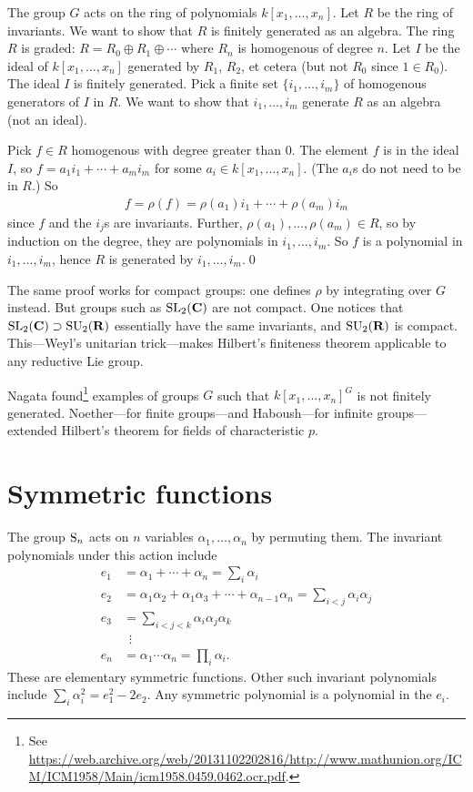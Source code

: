 \documentclass[11pt, oneside,margin=1in]{article}
\begin{document}
The group $G$ acts on the ring of polynomials $k[x_1,\hdots, x_n]$. Let $R$ be the ring of invariants. We want to show that $R$ is finitely generated as an algebra. The ring $R$ is graded: $R= R_0\oplus R_1 \oplus \cdots $ where $R_n$ is homogenous of degree $n$. Let $I$ be the ideal of $k[x_1,\hdots,x_n]$ generated by $R_1$, $R_2$, et cetera (but not $R_0$ since $1\in R_0$). The ideal $I$ is finitely generated. Pick a finite set $\{i_1,\hdots, i_m\}$ of homogenous generators of $I$ in $R$. We want to show that $i_1,\hdots, i_m$ generate $R$ as an algebra (not an ideal).

Pick $f\in R$ homogenous with degree greater than $0$. The element $f$ is in the ideal $I$, so $f = a_1 i_1 + \cdots + a_mi_m$ for some $a_i\in k[x_1,\hdots, x_n]$. (The $a_i$s do not need to be in $R$.) So 
\begin{align*}
	f = \rho(f) = \rho(a_1)i_1+\cdots + \rho (a_m) i_m
\end{align*}
since $f$ and the $i_j$s are invariants. Further, $\rho(a_1), \hdots, \rho (a_m) \in R$, so by induction on the degree, they are polynomials in $i_1,\hdots, i_m$. So $f$ is a polynomial in $i_1,\hdots,i_m$, hence $R$ is generated by $i_1,\hdots, i_m$.\hfill \qed

The same proof works for compact groups: one defines $\rho$ by integrating over $G$ instead. But groups such as $\operatorname{SL}_{2}(\mathbf{C})$ are not compact. One notices that $\operatorname{SL}_{2}(\mathbf C) \supset \operatorname{SU}_2 (\mathbf R)$ essentially have the same invariants, and $\operatorname{SU}_2(\mathbf R)$ is compact. This---Weyl's unitarian trick---makes Hilbert's finiteness theorem applicable to any reductive Lie group. 

Nagata found\footnote{See \url{https://web.archive.org/web/20131102202816/http://www.mathunion.org/ICM/ICM1958/Main/icm1958.0459.0462.ocr.pdf}.} examples of groups $G$ such that $k[x_1,\hdots, x_n]^G$ is not finitely generated. Noether---for finite groups---and Haboush---for infinite groups---extended Hilbert's theorem for fields of characteristic $p$.
\section{Symmetric functions}
The group $\operatorname{S}_n$ acts on $n$ variables $\alpha_1,\hdots,\alpha_n$ by permuting them. The invariant polynomials under this action include
\begin{align*}
	e_1 &= \alpha_1 + \cdots + \alpha_n = \sum_i \alpha_i\\
	e_2 &= \alpha_1\alpha_2 + \alpha_1\alpha_3 + \cdots + \alpha_{n-1}\alpha_n = \sum_{i<j} \alpha_i\alpha_j\\
	e_3 &= \sum_{i<j<k} \alpha_i\alpha_j\alpha_k\\
	    &\,\,\, \vdots\\
	e_n &= \alpha_1\cdots\alpha_n = \prod_i\alpha_i.
\end{align*}
These are elementary symmetric functions. Other such invariant polynomials include $\sum_i \alpha_i^2 = e_1^2 -2e_2$. Any symmetric polynomial is a polynomial in the $e_i$.
\end{document}
